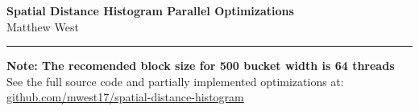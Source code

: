 \documentclass[a4paper,12pt]{article}
\begin{document}
	\pagestyle{fancy}
	\thispagestyle{empty}
	\fancyhead[R]{}
	\fancyhead[L]{}
	\renewcommand*{\thefootnote}{\fnsymbol{footnote}}
	\begin{center}
		\Large{\textbf{Spatial Distance Histogram Parallel Optimizations}}
		\vspace{0.4cm}
		\normalsize
		\\ Matthew West
		\vspace{0.1cm}
		\medskip
		\normalsize
	\end{center}
	{\color{gray}\hrule}
	\vspace{0.4cm}
	\medskip
	\begin{multicols}{2}
	\end{multicols}
	
	\begin{multicols}{2}
	\end{multicols}
	 
 	\vspace{20pt}
 	
 	\noindent \textbf{Note: The recomended block size for 500 bucket width is 64 threads}\\
	\noindent See the full source code and partially implemented optimizations at:\\ \href{https://github.com/mwest17/spatial-distance-histogram}{github.com/mwest17/spatial-distance-histogram}

\end{document}
